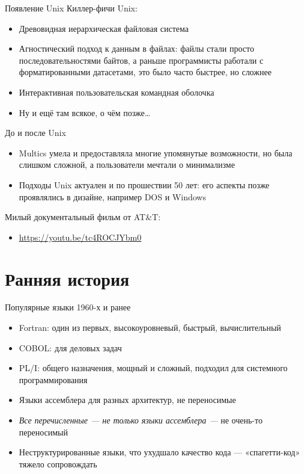 \documentclass[xetex,aspectratio=169]{beamer}
\begin{document}
\begin{frame}{Появление Unix}
Киллер-фичи Unix:

\begin{itemize}
	\item Древовидная иерархическая файловая система
	\item Агностический подход к данным в файлах: файлы стали просто последовательностями байтов, а раньше программисты работали с форматированными датасетами, это было часто быстрее, но сложнее
	\item Интерактивная пользовательская командная оболочка
	\pause
	\item Ну и ещё там всякое, о чём позже\ldots
\end{itemize}

\end{frame}

\begin{frame}{До и после Unix}

\begin{itemize}
	\item Multics умела и предоставляла многие упомянутые возможности, но была слишком сложной, а пользователи мечтали о минимализме
	\item Подходы Unix актуален и по прошествии 50 лет: его аспекты позже проявлялись в дизайне, например DOS и Windows
\end{itemize}

Милый документальный фильм от AT\&T:
\begin{itemize}
	\item \url{https://youtu.be/tc4ROCJYbm0}
\end{itemize}

\end{frame}

\section{Ранняя история}

\begin{frame}{Популярные языки 1960-х и ранее}
	\begin{itemize}
		\item Fortran: один из первых, высокоуровневый, быстрый, вычислительный
		\item COBOL: для деловых задач
		\item PL/I: общего назначения, мощный и сложный, подходил для системного программирования
		\item Языки ассемблера для разных архитектур, не переносимые
	\end{itemize}

\pause

	\begin{itemize}
		\item \emph{Все перечисленные --- не только языки ассемблера ---} не очень-то переносимый
		\item Неструктурированные языки, что ухудшало качество кода --- «спагетти-код» тяжело сопровождать
	\end{itemize}
\end{frame}
\end{document}
